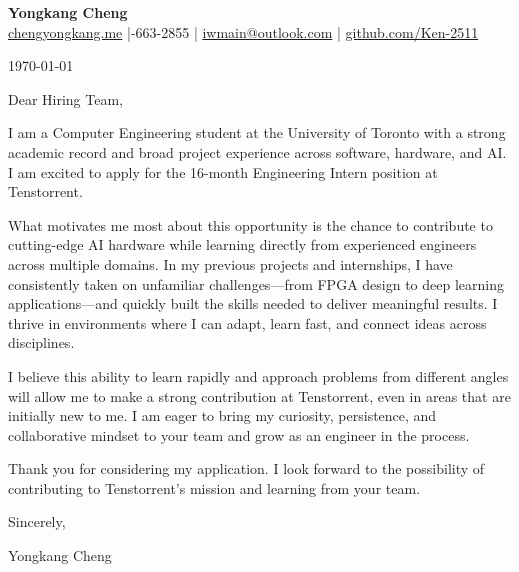 \documentclass[11pt]{article}
\begin{document}
{\Large \textbf{Yongkang Cheng}}\\[2pt]
\href{https://chengyongkang.me/}{chengyongkang.me} \;|-663-2855 \;|\; \href{mailto:iwmain@outlook.com}{iwmain@outlook.com} \;|\; \href{https://github.com/Ken-2511}{github.com/Ken-2511}

\today

\vspace{0.6em}
Dear Hiring Team,

I am a Computer Engineering student at the University of Toronto with a strong academic record and broad project experience across software, hardware, and AI. I am excited to apply for the 16-month Engineering Intern position at Tenstorrent.

What motivates me most about this opportunity is the chance to contribute to cutting-edge AI hardware while learning directly from experienced engineers across multiple domains. In my previous projects and internships, I have consistently taken on unfamiliar challenges—from FPGA design to deep learning applications—and quickly built the skills needed to deliver meaningful results. I thrive in environments where I can adapt, learn fast, and connect ideas across disciplines.

I believe this ability to learn rapidly and approach problems from different angles will allow me to make a strong contribution at Tenstorrent, even in areas that are initially new to me. I am eager to bring my curiosity, persistence, and collaborative mindset to your team and grow as an engineer in the process.

Thank you for considering my application. I look forward to the possibility of contributing to Tenstorrent’s mission and learning from your team.

Sincerely,

Yongkang Cheng
\end{document}
